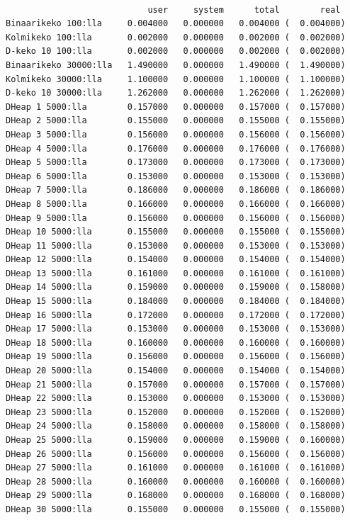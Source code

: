 \documentclass[a4paper,12pt]{article}
\begin{document}
\scriptsize
\begin{verbatim}

                            user     system      total        real
Binaarikeko 100:lla     0.004000   0.000000   0.004000 (  0.004000)
Kolmikeko 100:lla       0.002000   0.000000   0.002000 (  0.002000)
D-keko 10 100:lla       0.002000   0.000000   0.002000 (  0.002000)
Binaarikeko 30000:lla   1.490000   0.000000   1.490000 (  1.490000)
Kolmikeko 30000:lla     1.100000   0.000000   1.100000 (  1.100000)
D-keko 10 30000:lla     1.262000   0.000000   1.262000 (  1.262000)
DHeap 1 5000:lla        0.157000   0.000000   0.157000 (  0.157000)
DHeap 2 5000:lla        0.155000   0.000000   0.155000 (  0.155000)
DHeap 3 5000:lla        0.156000   0.000000   0.156000 (  0.156000)
DHeap 4 5000:lla        0.176000   0.000000   0.176000 (  0.176000)
DHeap 5 5000:lla        0.173000   0.000000   0.173000 (  0.173000)
DHeap 6 5000:lla        0.153000   0.000000   0.153000 (  0.153000)
DHeap 7 5000:lla        0.186000   0.000000   0.186000 (  0.186000)
DHeap 8 5000:lla        0.166000   0.000000   0.166000 (  0.166000)
DHeap 9 5000:lla        0.156000   0.000000   0.156000 (  0.156000)
DHeap 10 5000:lla       0.155000   0.000000   0.155000 (  0.155000)
DHeap 11 5000:lla       0.153000   0.000000   0.153000 (  0.153000)
DHeap 12 5000:lla       0.154000   0.000000   0.154000 (  0.154000)
DHeap 13 5000:lla       0.161000   0.000000   0.161000 (  0.161000)
DHeap 14 5000:lla       0.159000   0.000000   0.159000 (  0.158000)
DHeap 15 5000:lla       0.184000   0.000000   0.184000 (  0.184000)
DHeap 16 5000:lla       0.172000   0.000000   0.172000 (  0.172000)
DHeap 17 5000:lla       0.153000   0.000000   0.153000 (  0.153000)
DHeap 18 5000:lla       0.160000   0.000000   0.160000 (  0.160000)
DHeap 19 5000:lla       0.156000   0.000000   0.156000 (  0.156000)
DHeap 20 5000:lla       0.154000   0.000000   0.154000 (  0.154000)
DHeap 21 5000:lla       0.157000   0.000000   0.157000 (  0.157000)
DHeap 22 5000:lla       0.153000   0.000000   0.153000 (  0.153000)
DHeap 23 5000:lla       0.152000   0.000000   0.152000 (  0.152000)
DHeap 24 5000:lla       0.158000   0.000000   0.158000 (  0.158000)
DHeap 25 5000:lla       0.159000   0.000000   0.159000 (  0.160000)
DHeap 26 5000:lla       0.156000   0.000000   0.156000 (  0.156000)
DHeap 27 5000:lla       0.161000   0.000000   0.161000 (  0.161000)
DHeap 28 5000:lla       0.160000   0.000000   0.160000 (  0.160000)
DHeap 29 5000:lla       0.168000   0.000000   0.168000 (  0.168000)
DHeap 30 5000:lla       0.155000   0.000000   0.155000 (  0.155000)

\end{verbatim}
\end{document}
